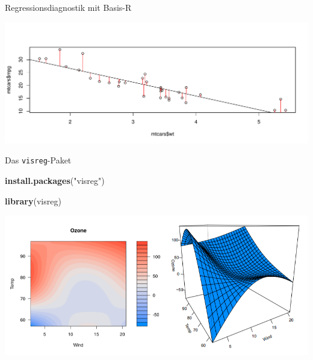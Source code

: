 \documentclass[ignorenonframetext,]{beamer}
\newenvironment{Shaded}{\begin{snugshade}}{\end{snugshade}}
\newcommand{\DataTypeTok}[1]{\textcolor[rgb]{0.13,0.29,0.53}{#1}}
\newcommand{\KeywordTok}[1]{\textcolor[rgb]{0.13,0.29,0.53}{\textbf{#1}}}
\newcommand{\NormalTok}[1]{#1}
\newcommand{\OperatorTok}[1]{\textcolor[rgb]{0.81,0.36,0.00}{\textbf{#1}}}
\newcommand{\StringTok}[1]{\textcolor[rgb]{0.31,0.60,0.02}{#1}}
\begin{document}
\begin{frame}[fragile]{Regressionsdiagnostik mit Basis-R}
\protect\hypertarget{regressionsdiagnostik-mit-basis-r}{}

\begin{Shaded}
\end{Shaded}

\includegraphics{B3_linreg_files/figure-beamer/unnamed-chunk-25-1.pdf}

\end{frame}

\begin{frame}[fragile]{Das \texttt{visreg}-Paket}
\protect\hypertarget{das-visreg-paket}{}

\begin{Shaded}
\begin{Highlighting}[]
\KeywordTok{install.packages}\NormalTok{(}\StringTok{"visreg"}\NormalTok{)}
\end{Highlighting}
\end{Shaded}

\begin{Shaded}
\begin{Highlighting}[]
\KeywordTok{library}\NormalTok{(visreg)}
\end{Highlighting}
\end{Shaded}

\includegraphics{figure/visreg.PNG}

\end{frame}
\end{document}
